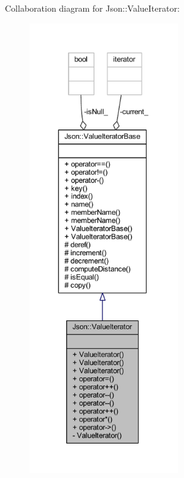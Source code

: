 Collaboration diagram for Json\+:\+:Value\+Iterator\+:\nopagebreak
\begin{figure}[H]
\begin{center}
\leavevmode
\includegraphics[height=550pt]{class_json_1_1_value_iterator__coll__graph}
\end{center}
\end{figure}
